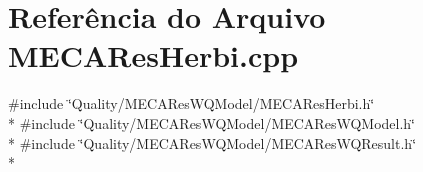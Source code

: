\section{Referência do Arquivo M\+E\+C\+A\+Res\+Herbi.\+cpp}
\label{_m_e_c_a_res_herbi_8cpp}
{\ttfamily \#include \char`\"{}Quality/\+M\+E\+C\+A\+Res\+W\+Q\+Model/\+M\+E\+C\+A\+Res\+Herbi.\+h\char`\"{}}\\*
{\ttfamily \#include \char`\"{}Quality/\+M\+E\+C\+A\+Res\+W\+Q\+Model/\+M\+E\+C\+A\+Res\+W\+Q\+Model.\+h\char`\"{}}\\*
{\ttfamily \#include \char`\"{}Quality/\+M\+E\+C\+A\+Res\+W\+Q\+Model/\+M\+E\+C\+A\+Res\+W\+Q\+Result.\+h\char`\"{}}\\*
